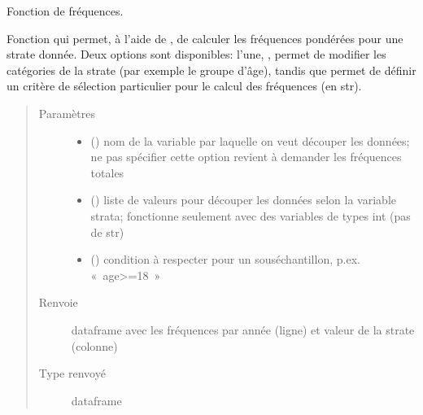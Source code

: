 \documentclass[letterpaper,10pt,french]{sphinxmanual}
\begin{document}
\begin{fulllineitems}
\begin{fulllineitems}
\begin{quote}
\begin{description}
\end{description}\end{quote}

\end{fulllineitems}


\begin{fulllineitems}
\label{\detokenize{code:simgen.statistics.freq}}
Fonction de fréquences.

Fonction qui permet, à l’aide de , de calculer les fréquences pondérées pour une strate donnée. Deux options sont disponibles: l’une, , permet de modifier les catégories de la strate (par exemple le groupe d’âge), tandis que  permet de définir un critère de sélection particulier pour le calcul des fréquences (en str).
\begin{quote}\begin{description}
\item[{Paramètres}] \leavevmode\begin{itemize}
\item {} 
 () \textendash{} nom de la variable par laquelle on veut découper les données; ne pas spécifier cette option revient à demander les fréquences totales

\item {} 
 () \textendash{} liste de valeurs pour découper les données selon la variable strata; fonctionne seulement avec des variables de types int (pas de str)

\item {} 
 () \textendash{} condition à respecter pour un sous\sphinxhyphen{}échantillon, p.ex. « age\textgreater{}=18 »

\end{itemize}

\item[{Renvoie}] \leavevmode
dataframe avec les fréquences par année (ligne) et valeur de la strate (colonne)

\item[{Type renvoyé}] \leavevmode
dataframe


\end{description}
\end{quote}
\end{fulllineitems}
\end{fulllineitems}
\end{document}
